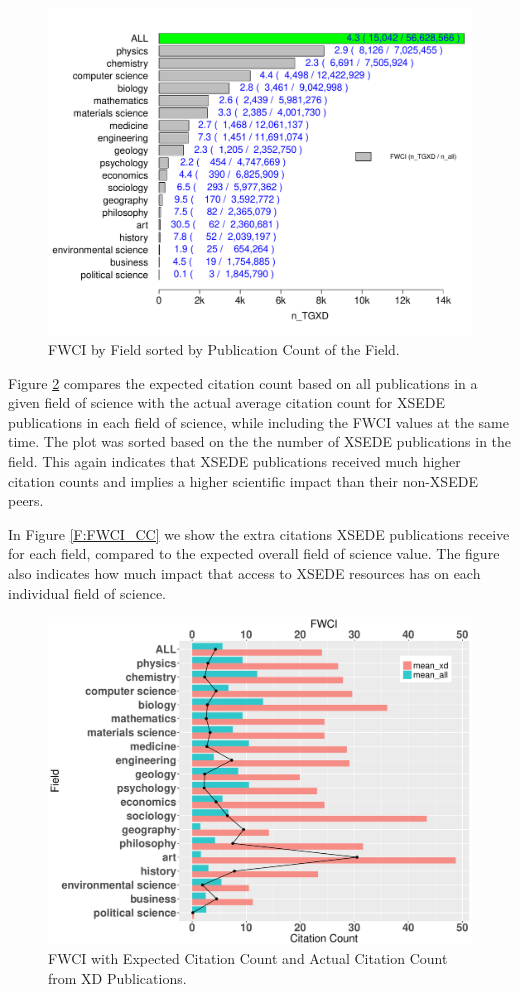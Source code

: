 \documentclass{sig-alternate}
\begin{document}
\begin{figure}[htb!]
    \includegraphics[width=0.95\columnwidth]{images/fwci_nxd.pdf}
    \caption{FWCI by Field sorted by Publication Count of the Field.}
    \label{F:fwci_nxd}
\end{figure}

Figure \ref{F:FWCIwCC} compares the expected citation count based on
all publications in a given field of science with the actual average
citation count for XSEDE publications in each field of science, while
including the FWCI values at the same time. The plot was sorted based
on the the number of XSEDE publications in the field. This
again indicates that XSEDE publications received much higher citation
counts and implies a higher scientific impact than their non-XSEDE
peers.

In Figure \ref{F:FWCI_CC} we show the extra citations XSEDE
publications receive for each field, compared to the expected overall
field of science value. The figure also indicates how much impact that access
to XSEDE resources has on each individual field of science.

\begin{figure}[htb!]
    \includegraphics[width=0.95\columnwidth]{images/FWCIwCC.pdf}
    \caption{FWCI with Expected Citation Count and Actual Citation Count from XD Publications.}
    \label{F:FWCIwCC}
\end{figure}
\end{document}
